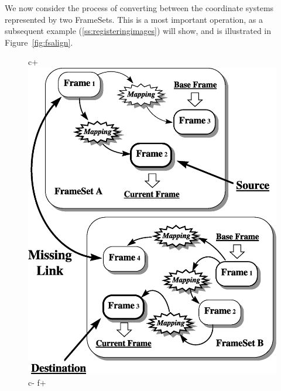 \documentclass[twoside,11pt]{article}
\newenvironment{latexonly}{}{}
\newcommand{\secref}[1]{\S\ref{#1}}
\renewcommand{\secref}[1]{\ref{#1}}
\begin{document}
\begin{latexonly}
   We now consider the process of converting between the coordinate
   systems represented by two FrameSets. This is a most important
   operation, as a subsequent example (\secref{ss:registeringimages})
   will show, and is illustrated in Figure~\ref{fig:fsalign}.
   \begin{figure}
   \begin{center}
c+
   \includegraphics[scale=0.6]{sun211_figures/fsalign.eps}
c-
f+

\end{center}
\end{figure}
\end{latexonly}
\end{document}
